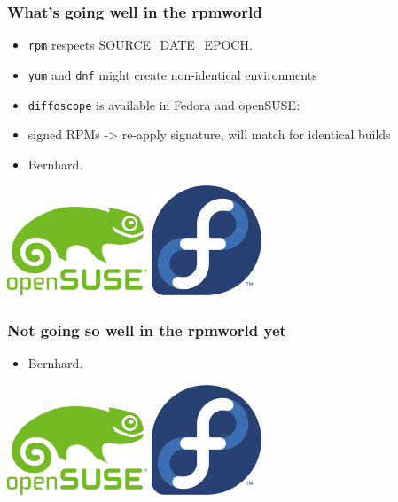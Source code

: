 \documentclass[14pt,aspectratio=169]{beamer}
\begin{document}
\begin{frame}
 \frametitle{What's going well in the rpmworld}
 \begin{itemize}
  \item \texttt{rpm} respects SOURCE\_DATE\_EPOCH.
  \item \texttt{yum} and \texttt{dnf} might create non-identical environments
  \item \texttt{diffoscope} is available in Fedora and openSUSE:
  \item signed RPMs -> re-apply signature, will match for identical builds
  \item<2> Bernhard.
  \end{itemize}
 \begin{center}
  \includegraphics[height=0.1\paperheight]{images/openSUSE.png}
  \hspace{0.1\paperwidth}
 \includegraphics[height=0.1\paperheight]{images/fedora.png}
  \hspace{0.1\paperwidth}
 \end{center}

\end{frame}


\begin{frame}
 \frametitle{Not going so well in the rpmworld yet}
 \begin{itemize}
  \item Bernhard.
  \end{itemize}
 \begin{center}
  \includegraphics[height=0.1\paperheight]{images/openSUSE.png}
  \hspace{0.1\paperwidth}
 \includegraphics[height=0.1\paperheight]{images/fedora.png}
  \hspace{0.1\paperwidth}
 \end{center}

\end{frame}
\end{document}

